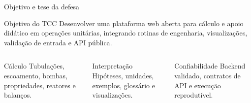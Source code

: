 
\begin{frame}{Objetivo e tese da defesa}
  \begin{block}{Objetivo do TCC}
    Desenvolver uma plataforma web aberta para cálculo e apoio didático em operações unitárias, integrando rotinas de engenharia, visualizações, validação de entrada e API pública.
  \end{block}
  \vspace{0.45em}
  \begin{columns}[T,onlytextwidth]
      \begin{block}{Cálculo}
        Tubulações, escoamento, bombas, propriedades, reatores e balanços.
      \end{block}
      \begin{block}{Interpretação}
        Hipóteses, unidades, exemplos, glossário e visualizações.
      \end{block}
      \begin{block}{Confiabilidade}
        Backend validado, contratos de API e execução reprodutível.
      \end{block}
  \end{columns}
\end{frame}
